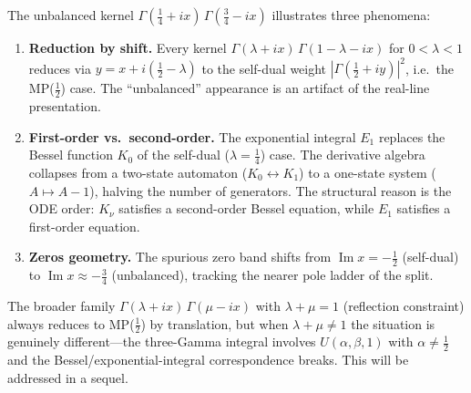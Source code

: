 \documentclass[11pt,a4paper]{article}
\begin{document}
The unbalanced kernel $\Gamma(\tfrac14+ix)\,\Gamma(\tfrac34-ix)$
illustrates three phenomena:

\begin{enumerate}
\item \textbf{Reduction by shift.}  Every kernel
  $\Gamma(\lambda+ix)\,\Gamma(1-\lambda-ix)$ for
  $0 < \lambda < 1$ reduces via $y = x + i(\tfrac12-\lambda)$
  to the self-dual weight $|\Gamma(\tfrac12+iy)|^2$, i.e.\ the
  MP($\tfrac12$) case.  The ``unbalanced'' appearance is an
  artifact of the real-line presentation.

\item \textbf{First-order vs.\ second-order.}  The exponential
  integral $E_1$ replaces the Bessel function $K_0$ of the
  self-dual ($\lambda = \tfrac14$) case.  The derivative
  algebra collapses from a two-state automaton ($K_0 \leftrightarrow K_1$)
  to a one-state system ($A \mapsto A - 1$), halving the number
  of generators.  The structural reason is the ODE order:
  $K_\nu$ satisfies a second-order Bessel equation, while
  $E_1$ satisfies a first-order equation.

\item \textbf{Zeros geometry.}  The spurious zero band shifts
  from $\operatorname{Im} x = -\tfrac12$ (self-dual) to
  $\operatorname{Im} x \approx -\tfrac34$ (unbalanced),
  tracking the nearer pole ladder of the split.
\end{enumerate}

The broader family $\Gamma(\lambda+ix)\,\Gamma(\mu-ix)$ with
$\lambda + \mu = 1$ (reflection constraint) always reduces to
MP($\tfrac12$) by translation, but when $\lambda + \mu \ne 1$
the situation is genuinely different---the three-Gamma integral
involves $U(\alpha, \beta, 1)$ with $\alpha \ne \tfrac12$ and
the Bessel/exponential-integral correspondence breaks.  This
will be addressed in a sequel.
\end{document}
